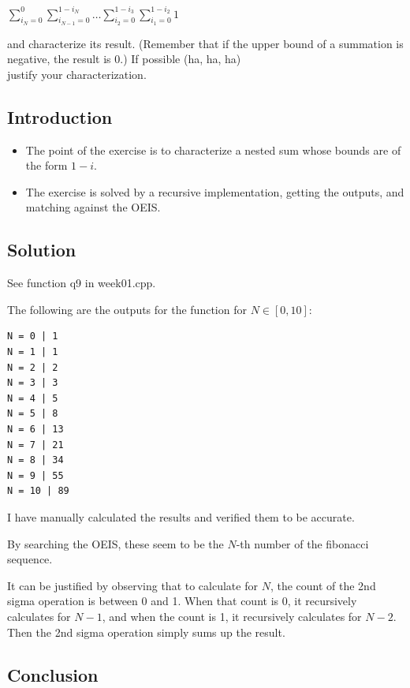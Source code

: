 \documentclass[12pt]{article}
\begin{document}
$\displaystyle\sum_{i_{N}=0}^{0}\sum_{i_{N-1}=0}^{1-i_{N}}\dots\sum_{i_{2}=0}^{1-i_{3}}\sum_{i_{1}=0}^{1-i_{2}}1$

and characterize its result. (Remember that if the upper bound of a summation is
negative, the result is 0.) If possible (ha, ha, ha) \\ justify your
characterization.


\subsection{Introduction}

\begin{itemize}

\item
  The point of the exercise is to characterize a nested sum whose bounds are of the form $1 - i$.

\item
  The exercise is solved by a recursive implementation, getting the outputs, and matching against the OEIS.

\end{itemize}


\subsection{Solution}

See function q9 in week01.cpp.

The following are the outputs for the function for $N \in [0,10]$:

\begin{verbatim}
N = 0 | 1
N = 1 | 1
N = 2 | 2
N = 3 | 3
N = 4 | 5
N = 5 | 8
N = 6 | 13
N = 7 | 21
N = 8 | 34
N = 9 | 55
N = 10 | 89
\end{verbatim}

I have manually calculated the results and verified them to be accurate.

By searching the OEIS, these seem to be the $N$-th number of the fibonacci
sequence.

It can be justified by observing that to calculate for $N$, the count of the 2nd
sigma operation is between 0 and 1. When that count is 0, it recursively
calculates for $N-1$, and when the count is 1, it recursively calculates for
$N-2$. Then the 2nd sigma operation simply sums up the result.


\subsection{Conclusion}
\end{document}
